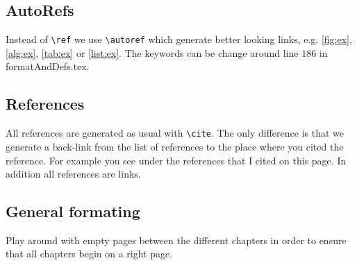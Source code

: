 \subsection{AutoRefs}
Instead of \texttt{\textbackslash ref} we use \texttt{\textbackslash autoref} which generate better looking links, e.g. \autoref{fig:ex}, \autoref{alg:ex}, \autoref{tab:ex} or \autoref{list:ex}. The keywords can be change around line $186$ in formatAndDefs.tex.

\subsection{References}
All references are generated as usual with \texttt{\textbackslash cite}. The only difference is that we generate a back-link from the list of references to the place where you cited the reference. For example you see under the references that I cited \cite{wiki} on this page. In addition all references are links.

\subsection{General formating}
Play around with empty pages between the different chapters in order to ensure that all chapters begin on a right page.


